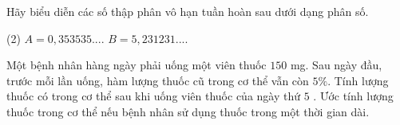 \begin{vd} 
	Hãy biểu diễn các số thập phân vô hạn tuần hoàn sau dưới dạng phân số.
	\begin{tasks}(2)
		\task $A=0,353535... $.
		\task $B=5,231231... $. 
	\end{tasks}
\end{vd}

\begin{vd}
	Một bệnh nhân hàng ngày phải uống một viên thuốc $150$ mg. Sau ngày đầu, trước mỗi lần uống, hàm lượng thuốc cũ trong cơ thể vẫn còn $5 \%$. Tính lượng thuốc có trong cơ thể sau khi uống viên thuốc của ngày thứ $5$ . Ước tính lượng thuốc trong cơ thể nếu bệnh nhân sử dụng thuốc trong một thời gian dài.
	\loigiai{
	}
\end{vd}

